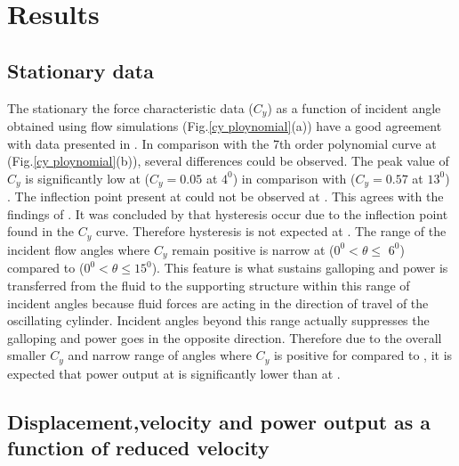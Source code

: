  \section{Results}

\subsection{Stationary data}

The stationary the force characteristic data ($C_y$) as a function of incident angle obtained using flow simulations (Fig.\ref{cy ploynomial}(a)) have a good agreement with data presented in \cite{Joly2012}. In comparison with the 7th order polynomial curve at  (Fig.\ref{cy ploynomial}(b)),  several differences could be observed. The peak value of $C_y$ is  significantly low at  ($C_y=0.05$ at $4^0$) in comparison with  ($C_y=0.57$ at $13^0$) . The inflection point present at  could not be observed at . This agrees with the findings of \cite{Luo2003}. It was concluded by \cite{Luo2003} that hysteresis occur due to the inflection point found in the $C_y$ curve. Therefore hysteresis is not expected at . The range of the incident flow angles where $C_y$ remain positive is narrow at  ($0^0 <\theta \leq$ $6^0$) compared to  ($0^0 <\theta \leq 15^0$). This feature is what sustains galloping and power is transferred from the fluid to the supporting structure within this range of incident angles because fluid forces are acting in the direction of travel of the oscillating cylinder. Incident angles beyond this range actually suppresses the galloping and power goes in the opposite direction. Therefore due to the overall smaller $C_y$ and narrow range of angles where $C_y$ is positive for  compared to , it is expected that power output at  is significantly lower than at . 

  



\subsection{Displacement,velocity and power output as a function of reduced velocity}


